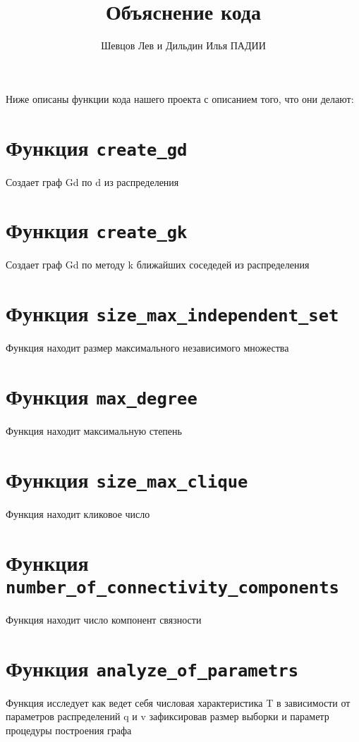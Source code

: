 \documentclass{article}
\title{Объяснение кода}
\author{Шевцов Лев и Дильдин Илья ПАДИИ}
\date{ }
\begin{document}
\maketitle
  
Ниже описаны функции кода нашего проекта с описанием того, что они делают:

\section{Функция \texttt{create\_gd}}

Создает граф Gd по d из распределения

\section{Функция \texttt{create\_gk}}

Создает граф Gd по методу k ближайших соседедей из распределения

\section{Функция \texttt{size\_max\_independent\_set}}

Функция находит размер максимального независимого множества

\section{Функция \texttt{max\_degree}}

Функция находит максимальную степень

\section{Функция \texttt{size\_max\_clique}}

Функция находит кликовое число

\section{Функция \texttt{number\_of\_connectivity\_components}}

Функция находит число компонент связности

\section{Функция \texttt{analyze\_of\_parametrs}}

Функция исследует как ведет себя числовая характеристика T в зависимости от параметров распределений q и v зафиксировав размер выборки и параметр процедуры построения графа
\end{document}
